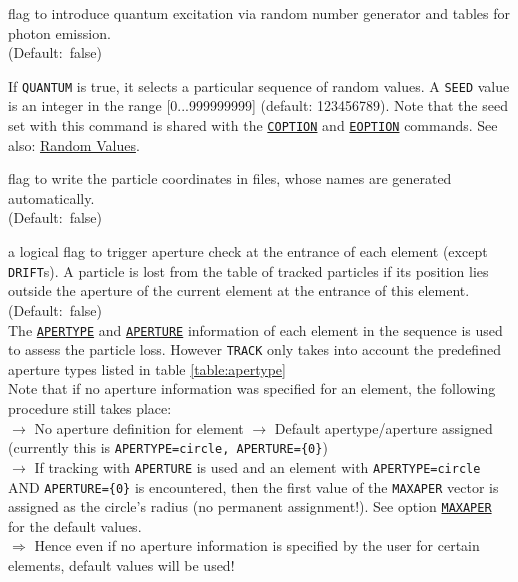 \begin{madlist}
   flag to introduce quantum excitation via random
  number generator and tables for photon emission. \\ (Default:~false)

   If \texttt{QUANTUM} is true, it selects a particular sequence of random values. 
A \texttt{SEED} value is an integer in the range [0...999999999] (default:
123456789). Note that the seed set with this command is shared with the \hyperref[sec:coption]{\texttt{COPTION}} and \hyperref[sec:coption]{\texttt{EOPTION}} commands. See also: \hyperref[subsubsec:random]{Random Values}.

   flag to write the particle coordinates in files, whose
  names are generated automatically. \\ (Default:~false)

   a logical flag to trigger aperture check at the entrance 
  of each element (except \texttt{DRIFT}s). A particle is lost from the table of 
  tracked particles if its position lies outside the aperture of the current 
  element at the entrance of this element. \\ 
  (Default:~false) \\
  
  The \hyperref[chap:aperture]{\texttt{APERTYPE}} and 
  \hyperref[chap:aperture]{\texttt{APERTURE}} information of each element 
  in the sequence is used to assess the particle loss. 
  However \texttt{TRACK} only takes into account the predefined aperture 
  types listed in table \ref{table:apertype}
  \\
  
  Note that if no aperture information was specified for an element, 
  the following procedure still takes place:
  \\
  $\rightarrow$ No aperture definition for element $\rightarrow$ 
  Default apertype/aperture assigned (currently this is   
  \texttt{APERTYPE=circle, APERTURE=\{0\}}) 
  \\ $\rightarrow$  
  If tracking with \texttt{APERTURE} is used and an
  element with \texttt{APERTYPE=circle} AND \texttt{APERTURE=\{0\}}  
  is encountered, then the first value of the \texttt{MAXAPER} vector
  is assigned as the circle's radius (no permanent assignment!). 
  See option \hyperref[sec:run]{\texttt{MAXAPER}} for the default values. 
  \\ $\Rightarrow$
  Hence even if no aperture information is specified by the user for
  certain elements, default values will be used! 



\end{madlist}
